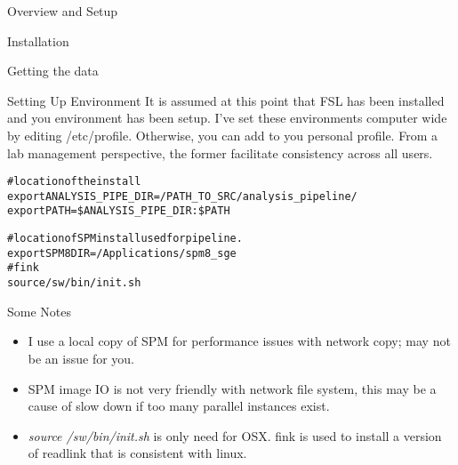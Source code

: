 \documentclass[]{report}
\begin{document}
\begin{chapter}{Overview and Setup}
\begin{section}{Installation}
\begin{subsection}{Getting the data}
\end{subsection}
\begin{subsection}{Setting Up Environment }
It is assumed at this point that FSL has been installed and you environment has been setup. I've set these environments computer wide by editing /etc/profile. Otherwise, you can add to you personal profile. From a lab management perspective, the former facilitate consistency across all users.

\begin{alltt}
#location of the install 
export ANALYSIS\_PIPE\_DIR=/PATH\_TO\_SRC/analysis\_pipeline/
export PATH=\${ANALYSIS_PIPE_DIR}:\${PATH}

#location of SPM install used for pipeline. 
export SPM8DIR=/Applications/spm8\_sge
#fink
source /sw/bin/init.sh
\end{alltt}
{Some Notes}
\begin{itemize}
	\item  I use a local copy of SPM for performance issues with network copy; may not be an issue for you.
	\item  SPM image IO is not very friendly with network file system, this may be a cause of slow down if too many parallel instances exist.
	\item {\it source /sw/bin/init.sh} is only need for OSX. fink is used to install a version of readlink that is consistent with linux.  
\end{itemize}
\end{subsection}

\end{section}



\end{chapter}
\end{document}
